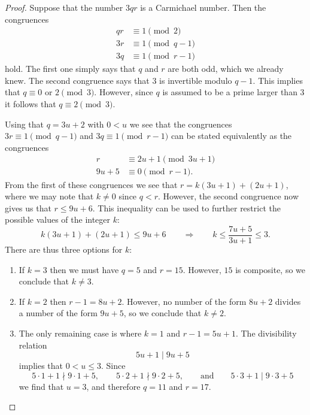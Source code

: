 \begin{proof}
  Suppose that the number $3qr$ is a Carmichael number. Then the congruences
  \begin{align*}
    qr & \equiv 1\pmod{2} \\
    3r & \equiv 1\pmod{q-1} \\
    3q & \equiv 1\pmod{r-1}
  \end{align*}
  hold. The first one simply says that $q$ and $r$ are both odd, which we already knew. The second congruence says that $3$ is invertible modulo $q-1$. This implies that $q\equiv 0$ or $2\pmod{3}$. However, since $q$ is assumed to be a prime larger than $3$ it follows that $q\equiv 2\pmod{3}$.

  Using that $q=3u+2$ with $0<u$ we see that the congruences $3r\equiv 1\pmod{q-1}$ and $3q\equiv 1\pmod{r-1}$ can be stated equivalently as the congruences
  \begin{align*}
    r & \equiv 2u+1\pmod{3u+1} \\
    9u+5 & \equiv 0\pmod{r-1}.
  \end{align*}
  From the first of these congruences we see that $r=k(3u+1)+(2u+1)$, where we may note that $k\neq 0$ since $q<r$. However, the second congruence now gives us that $r\leq 9u+6$. This inequality can be used to further restrict the possible values of the integer $k$:
  \begin{equation*}
    k(3u+1)+(2u+1)\leq 9u+6\qquad\Rightarrow\qquad
    k \leq \frac{7u+5}{3u+1}\leq 3.
  \end{equation*}
  There are thus three options for $k$:
  \begin{enumerate}
  \item If $k=3$ then we must have $q=5$ and $r=15$. However, $15$ is composite, so we conclude that $k\neq 3$.
  \item If $k=2$ then $r-1=8u+2$. However, no number of the form $8u+2$ divides a number of the form $9u+5$, so we conclude that $k\neq 2$.
  \item The only remaining case is where $k=1$ and $r-1=5u+1$. The divisibility relation
    \begin{equation*}
      5u+1\mid 9u+5
    \end{equation*}
    implies that $0<u\leq 3$. Since
    \begin{equation*}
      5\cdot 1 + 1\nmid 9\cdot 1+5,\qquad 5\cdot 2+1 \nmid 9\cdot 2+5,\qquad\text{and}\qquad 5\cdot 3+1\mid 9\cdot 3+5
    \end{equation*}
    we find that $u=3$, and therefore $q=11$ and $r=17$.\qedhere
  \end{enumerate}
\end{proof}


